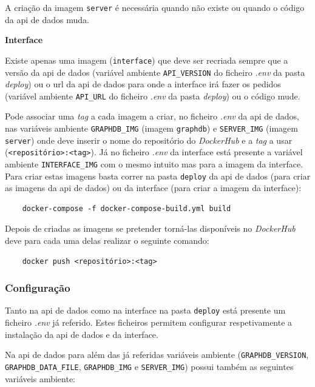 \begin{description}
    A criação da imagem \texttt{server} é necessária quando não existe ou quando o código da \acrshort{api} de dados muda.

    \item \textbf{Interface}

    Existe apenas uma imagem (\texttt{interface}) que deve ser recriada sempre que a versão da \acrshort{api} de dados (variável ambiente \texttt{API\_VERSION} do ficheiro \textit{.env} da pasta \textit{deploy}) ou o \acrshort{url} da \acrshort{api} de dados para onde a interface irá fazer os pedidos (variável ambiente \texttt{API\_URL} do ficheiro \textit{.env} da pasta \textit{deploy}) ou o código mude.
\end{description}

Pode associar uma \textit{tag} a cada imagem a criar, no ficheiro \textit{.env} da \acrshort{api} de dados, nas variáveis ambiente \texttt{GRAPHDB\_IMG} (imagem \texttt{graphdb}) e \texttt{SERVER\_IMG} (imagem \texttt{server}) onde deve inserir o nome do repositório do \textit{DockerHub} e a \textit{tag} a usar (\verb|<repositório>:<tag>|). Já no ficheiro \textit{.env} da interface está presente a variável ambiente \texttt{INTERFACE\_IMG} com o mesmo intuito mas para a imagem da interface. Para criar estas imagens basta correr na pasta \texttt{deploy} da \acrshort{api} de dados (para criar as imagens da \acrshort{api} de dados) ou da interface (para criar a imagem da interface):

\footnotesize
\begin{verbatim}
    docker-compose -f docker-compose-build.yml build
\end{verbatim}
\normalsize

Depois de criadas as imagens se pretender torná-las disponíveis no \textit{DockerHub} deve para cada uma delas realizar o seguinte comando:
\footnotesize
\begin{verbatim}
    docker push <repositório>:<tag>
\end{verbatim}
\normalsize

\subsubsection{Configuração}\label{sec:int-config}
Tanto na \acrshort{api} de dados como na interface na pasta \texttt{deploy} está presente um ficheiro \textit{.env} já referido. Estes ficheiros permitem configurar respetivamente a instalação da \acrshort{api} de dados e da interface.

Na \acrshort{api} de dados para além das já referidas variáveis ambiente (\texttt{GRAPHDB\_VERSION}, \texttt{GRAPHDB\_DATA\_FILE}, \texttt{GRAPHDB\_IMG} e \texttt{SERVER\_IMG}) possui também as seguintes variáveis ambiente:

